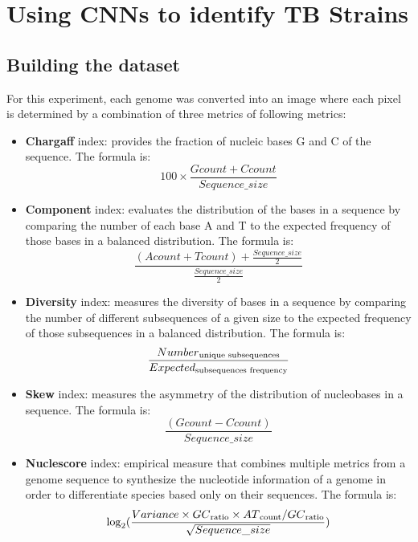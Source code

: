 \chapter{Using CNNs to identify TB Strains}
\label{chap:cnn_tb_strains}

\section{Building the dataset}
\label{sec:building_dataset}

For this experiment, each genome was converted into an image where each pixel is determined by a combination of three metrics of
following metrics:

\begin{itemize}
	\item \textbf{Chargaff} index: provides the fraction of nucleic bases G and C of the sequence. The formula is:
	      \begin{equation}
		      100 \times \frac{Gcount + Ccount}{Sequence\_size}
	      \end{equation}
	\item \textbf{Component} index: evaluates the distribution of the bases in a sequence by comparing the number of each base A and
	      T to the expected frequency of those bases in a balanced distribution. The formula is:
	      \begin{equation}
		      \frac{(Acount + Tcount) + \frac{Sequence\_size}{2}}{\frac{Sequence\_size}{2}}
	      \end{equation}
	\item \textbf{Diversity} index: measures the diversity of bases in a sequence by comparing the number of different subsequences of a
	      given size to the expected frequency of those subsequences in a balanced distribution. The formula is:
	      \begin{equation}
		      \frac{Number\textsubscript{unique subsequences}}{Expected\textsubscript{subsequences frequency}}
	      \end{equation}
	\item \textbf{Skew} index: measures the asymmetry of the distribution of nucleobases in a sequence. The formula is:
	      \begin{equation}
		      \frac{(Gcount - Ccount)}{Sequence\_size}
	      \end{equation}
	\item \textbf{Nuclescore} index: empirical measure that combines multiple metrics from a genome sequence to synthesize the nucleotide
	      information of a genome in order to differentiate species based only on their sequences. The formula is:
	      \begin{equation}
		      \log_{2}(\frac{Variance \times GC\textsubscript{ratio} \times AT\textsubscript{count}/GC\textsubscript{ratio}}{\sqrt{Sequence\_size}})
	      \end{equation}
\end{itemize}

